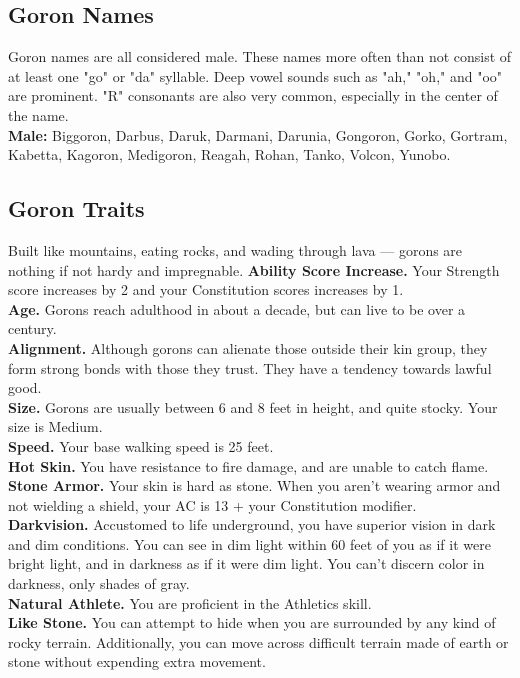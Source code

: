 \documentclass[10pt,twoside,twocolumn,openany]{book}
\begin{document}
\subsection{Goron Names}
Goron names are all considered male. These names more often than not consist of at least one "go" or "da" syllable. Deep vowel sounds such as "ah," "oh," and "oo" are prominent. "R" consonants are also very common, especially in the center of the name. \\
\textbf{Male:} Biggoron, Darbus, Daruk, Darmani, Darunia, Gongoron, Gorko, Gortram, Kabetta, Kagoron, Medigoron, Reagah, Rohan, Tanko, Volcon, Yunobo. 

\subsection{Goron Traits}
Built like mountains, eating rocks, and wading through lava — gorons are nothing if not hardy and impregnable.
\indent \textbf{Ability Score Increase.} Your Strength score increases by 2 and your Constitution scores increases by 1.\\
\indent \textbf{Age.} Gorons reach adulthood in about a decade, but can live to be over a century. \\
\indent \textbf{Alignment.} Although gorons can alienate those outside their kin group, they form strong bonds with those they trust. They have a tendency towards lawful good.\\
\indent \textbf{Size.} Gorons are usually between 6 and 8 feet in height, and quite stocky. Your size is Medium.\\
\indent \textbf{Speed.} Your base walking speed is 25 feet.\\
\indent \textbf{Hot Skin.} You have resistance to fire damage, and are unable to catch flame.\\
\indent \textbf{Stone Armor.} Your skin is hard as stone. When you aren’t wearing armor and not wielding a shield, your AC is 13 + your Constitution modifier.\\
\indent \textbf{Darkvision.} Accustomed to life underground, you have superior vision in dark and dim conditions. You can see in dim light within 60 feet of you as if it were bright light, and in darkness as if it were dim light. You can’t discern color in darkness, only shades of gray.\\
\indent \textbf{Natural Athlete.} You are proficient in the Athletics skill.\\
\indent \textbf{Like Stone.} You can attempt to hide when you are surrounded by any kind of rocky terrain. Additionally, you can move across difficult terrain made of earth or stone without expending extra movement.\\
\end{document}
